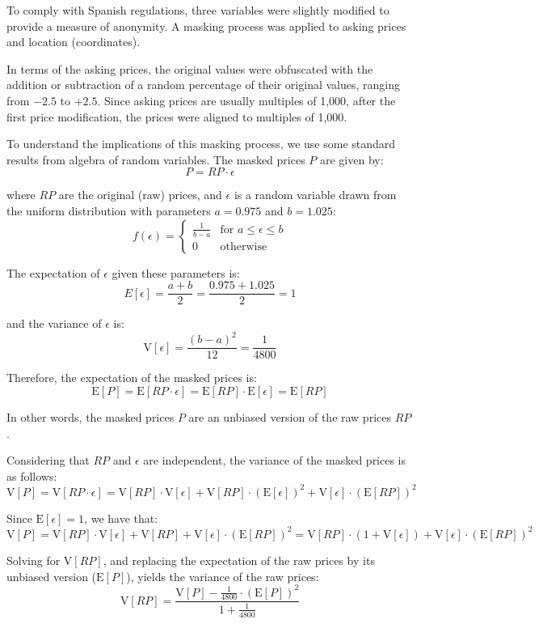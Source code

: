 \documentclass[Royal,times,sageh]{sagej}
\begin{document}
To comply with Spanish regulations, three variables were slightly
modified to provide a measure of anonymity. A masking process was
applied to asking prices and location (coordinates).

In terms of the asking prices, the original values were obfuscated with
the addition or subtraction of a random percentage of their original
values, ranging from \(-2.5%
\) to \(+2.5%
\). Since asking prices are usually multiples of 1,000, after the first
price modification, the prices were aligned to multiples of 1,000.

To understand the implications of this masking process, we use some
standard results from algebra of random variables. The masked prices
\(P\) are given by: \[
P = RP\cdot \epsilon
\]

\noindent where \(RP\) are the original (raw) prices, and \(\epsilon\)
is a random variable drawn from the uniform distribution with parameters
\(a=0.975\) and \(b=1.025\): \[
f(\epsilon) = 
\begin{cases}
\frac{1}{b - a} & \text{for } a\le \epsilon \le b\\
0 & \text{otherwise}
\end{cases}
\]

The expectation of \(\epsilon\) given these parameters is: \[
E[\epsilon] = \frac{a+b}{2} = \frac{0.975 + 1.025}{2} = 1
\]

\noindent and the variance of \(\epsilon\) is: \[
\mathrm{V}[\epsilon]=\frac{(b - a)^2}{12} = \frac{1}{4800}
\]

Therefore, the expectation of the masked prices is: \[
\mathrm{E}[P] = \mathrm{E}[RP\cdot \epsilon] = \mathrm{E}[RP]\cdot \mathrm{E}[\epsilon] = \mathrm{E}[RP]
\]

In other words, the masked prices \(P\) are an unbiased version of the
raw prices \(RP\).

Considering that \(RP\) and \(\epsilon\) are independent, the variance
of the masked prices is as follows: \[
\mathrm{V}[P] = \mathrm{V}[RP\cdot \epsilon] = \mathrm{V}[RP]\cdot \mathrm{V}[\epsilon] + \mathrm{V}[RP]\cdot (\mathrm{E}[\epsilon])^2 + \mathrm{V}[\epsilon]\cdot(\mathrm{E}[RP])^2
\]

Since \(\mathrm{E}[\epsilon] = 1\), we have that: \[
\mathrm{V}[P] = \mathrm{V}[RP]\cdot \mathrm{V}[\epsilon] + \mathrm{V}[RP] + \mathrm{V}[\epsilon]\cdot(\mathrm{E}[RP])^2 = \mathrm{V}[RP]\cdot (1 + \mathrm{V}[\epsilon]) + \mathrm{V}[\epsilon]\cdot(\mathrm{E}[RP])^2
\]

Solving for \(\mathrm{V}[RP]\), and replacing the expectation of the raw
prices by its unbiased version (\(\mathrm{E}[P]\)), yields the variance
of the raw prices: \[
\mathrm{V}[RP] = \frac{\mathrm{V}[P] - \frac{1}{4800}\cdot (\mathrm{E}[P])^2}{1 + \frac{1}{4800}}
\]
\end{document}
